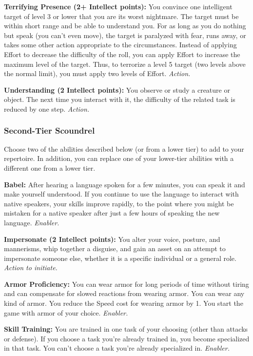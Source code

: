\documentclass[a4paper,10pt,final,twocolumn,oneside]{book}
\newcommand{\itemAbility}[2]{\textcolor{25gray}{\textbullet\textbf{ #1:}}{ #2}\par}
\newcommand{\enabler}{\textit{ Enabler.}}
\newcommand{\action}{\textit{ Action.}}
\newcommand{\actionInit}{\textit{ Action to initiate.}}
\begin{document}
\itemAbility{Terrifying Presence (2+ Intellect points)}{ You convince one intelligent target of level 3 or lower that you are its worst nightmare. The target must be within short range and be able to understand you. For as long as you do nothing but speak (you can’t even move), the target is paralyzed with fear, runs away, or takes some other action appropriate to the circumstances. Instead of applying Effort to decrease the difficulty of the roll, you can apply Effort to increase the maximum level of the target. Thus, to terrorize a level 5 target (two levels above the normal limit), you must apply two levels of Effort.\action}

\itemAbility{Understanding (2 Intellect points)}{You observe or study a creature or object. The next time you interact with it, the difficulty of the related task is reduced by one step.\action}


\subsubsection*{Second-Tier Scoundrel}
\label{subsub:scoundrelSecondTier}

Choose two of the abilities described below (or from a lower tier) to add to your repertoire. In addition, you can replace one of your lower-tier abilities with a different one from a lower tier.

\itemAbility{Babel}{After hearing a language spoken for a few minutes, you can speak it and make yourself understood. If you continue to use the language to interact with native speakers, your skills improve rapidly, to the point where you might be mistaken for a native speaker after just a few hours of speaking the new language.\enabler}

\itemAbility{Impersonate (2 Intellect points)}{You alter your voice, posture, and mannerisms, whip together a disguise, and gain an asset on an attempt to impersonate someone else, whether it is a specific individual or a general role.\actionInit}

\itemAbility{Armor Proficiency}{You can wear armor for long periods of time without tiring and can compensate for slowed reactions from wearing armor. You can wear any kind of armor. You reduce the Speed cost for wearing armor by 1. You start the game with armor of your choice.\enabler}

\itemAbility{Skill Training}{You are trained in one task of your choosing (other than attacks or defense). If you choose a task you’re already trained in, you become specialized in that task. You can’t choose a task you’re already specialized in.\enabler}
\end{document}
